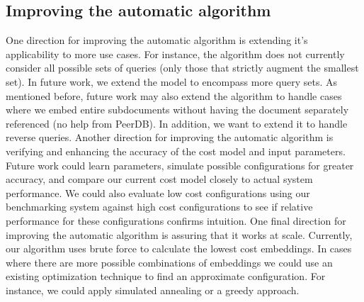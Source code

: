 \subsection{Improving the automatic algorithm}
One direction for improving the automatic algorithm is extending it's applicability to more use cases. For instance, the algorithm does not currently consider all possible sets of queries (only those that strictly augment the smallest set). In future work, we extend the model to encompass more query sets. As mentioned before, future work may also extend the algorithm to handle cases where we embed entire subdocuments without having the document separately referenced (no help from PeerDB). In addition, we want to extend it to handle reverse queries.
Another direction for improving the automatic algorithm is verifying and enhancing the accuracy of the cost model and input parameters. 
Future work could learn parameters, simulate possible configurations for greater accuracy, and compare our current cost model closely to actual system performance. 
We could also evaluate low cost configurations using our benchmarking system against high cost configurations to see if relative performance for these configurations confirms intuition.
One final direction for improving the automatic algorithm is assuring that it works at scale. Currently, our algorithm uses brute force to calculate the lowest cost embeddings. In cases where there are more possible combinations of embeddings we could use an existing optimization technique to find an approximate configuration. For instance, we could apply simulated annealing or a greedy approach.
